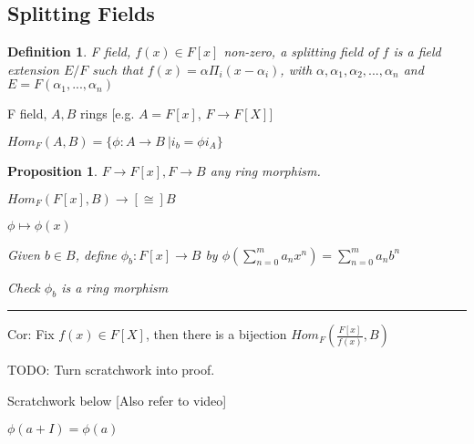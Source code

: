 \documentclass[twoside]{article}
\newtheorem{proposition}[theorem]{Proposition}
\newtheorem{definition}[theorem]{Definition}
\newenvironment{proof}{{\bf Proof:}}{\hfill\rule{2mm}{2mm}}
\begin{document}
    \subsection{Splitting Fields}

    \begin{definition}
        F field, $f(x) \in F[x]$ non-zero, a splitting field of $f$ is a field extension $E/F$ such that $f(x) = \alpha \Pi_i(x - \alpha_i)$, with $\alpha, \alpha_1, \alpha_2, ..., \alpha_n$ and $E = F(\alpha_1, ..., \alpha_n)$
    \end{definition}

    F field, $A,B$ rings [e.g. $A = F[x]$, $F \rightarrow F[X]$]
    

    \newcommand{\inj}{\rightarrow}
    
    $Hom_F(A,B) = \{\phi : A \rightarrow B\ \vert i_b = \phi i_A\}$

    \begin{proposition}
        $F \inj F[x], F \rightarrow B$ any ring morphism. 

        $Hom_F(F[x], B) \rightarrow[\cong] B$

        $\phi \mapsto \phi(x)$

        \begin{proof}
            Given $b \in B$, define $\phi_b: F[x] \rightarrow B$ by $\phi(\sum_{n=0}^ma_nx^n) = \sum_{n=0}^ma_nb^n$

            Check $\phi_b$ is a ring morphism
        \end{proof}
    \end{proposition}

    Cor: Fix $f(x) \in F[X]$, then there is a bijection $Hom_F (\frac{F[x]}{f(x)}, B)$
    
    TODO: Turn scratchwork into proof.

    Scratchwork below [Also refer to video]


    $\phi(a + I) = \phi(a)$ 
\end{document}
